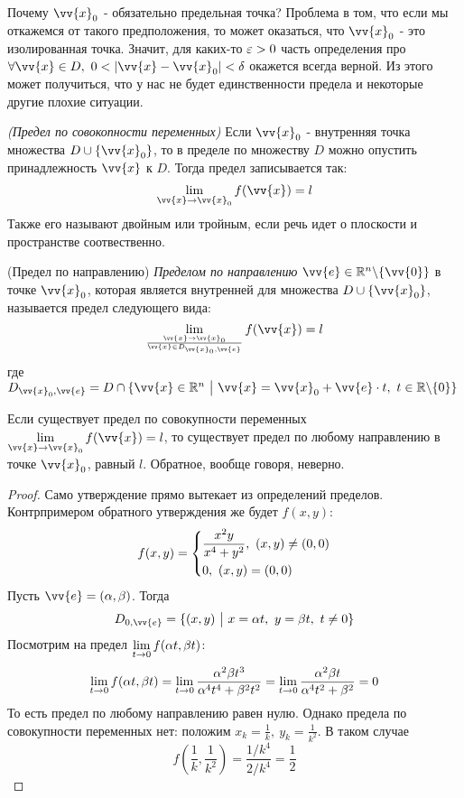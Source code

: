 \begin{note}
	Почему $\vv{x}_0$ - обязательно предельная точка? Проблема в том, что если мы откажемся от такого предположения, то может оказаться, что $\vv{x}_0$ - это изолированная точка. Значит, для каких-то $\varepsilon > 0$ часть определения про $\forall \vv{x} \in D,\ 0 < |\vv{x} - \vv{x}_0| < \delta$ окажется всегда верной. Из этого может получиться, что у нас не будет единственности предела и некоторые другие плохие ситуации.
\end{note}

\begin{definition}
	\textit{(Предел по совокопности переменных)}
	Если $\vv{x}_0$ - внутренняя точка множества $D \cup \{\vv{x}_0\}$, то в пределе по множеству $D$ можно опустить принадлежность $\vv{x}$ к $D$. Тогда предел записывается так:
	\[
		\liml_{\vv{x} \to \vv{x}_0} f(\vv{x}) = l
	\]
	Также его называют двойным или тройным, если речь идет о плоскости и пространстве соотвественно.
\end{definition}
\begin{definition} (Предел по направлению)
	\textit{Пределом по направлению} $\vv{e} \in \R^n \bs \{\vv{0}\}$ в точке $\vv{x}_0$, которая является внутренней для множества $D \cup \{\vv{x}_0\}$, называется предел следующего вида:
	\[
		\liml_{\vv{x} \to \vv{x}_0 \over \vv{x} \in D_{\vv{x}_0, \vv{e}}} f(\vv{x}) = l
	\]
	где	\(
	D_{\vv{x}_0, \vv{e}} = D \cap \{\vv{x} \in \R^n \such \vv{x} = \vv{x}_0 + \vv{e} \cdot t,\ t \in \R \bs \{0\}\}
	\)
\end{definition}

\begin{theorem}
	Если существует предел по совокупности переменных $\liml_{\vv{x} \to \vv{x}_0} f(\vv{x}) = l$, то существует предел по любому направлению в точке $\vv{x}_0$, равный $l$. Обратное, вообще говоря, неверно.
\end{theorem}

\begin{proof}
	Само утверждение прямо вытекает из определений  пределов. Контрпримером обратного утверждения же будет $f(x, y)$:
	\[
		f(x, y) = \left\{\begin{aligned}
			&{\frac{x^2 y}{x^4 + y^2},\ (x, y) \neq (0, 0)}
			\\
			&{0,\ (x, y) = (0, 0)}
		\end{aligned}\right.
	\]
	Пусть $\vv{e} = (\alpha, \beta)$. Тогда
	\[
		D_{0, \vv{e}} = \{(x, y) \such x = \alpha t,\ y = \beta t,\ t \neq 0\}
	\]
	Посмотрим на предел $\lim\limits_{t \to 0} f(\alpha t, \beta t)$:
	\[
		\lim\limits_{t \to 0} f(\alpha t, \beta t) = \lim\limits_{t \to 0} \frac{\alpha^2 \beta t^3}{\alpha^4 t^4 + \beta^2 t^2} = \lim\limits_{t \to 0} \frac{\alpha^2 \beta t}{\alpha^4 t^2 + \beta^2} = 0
	\]
	То есть предел по любому направлению равен нулю. Однако предела по совокупности переменных нет: положим $x_k = \frac{1}{k},\ y_k = \frac{1}{k^2}$. В таком случае
	\[
		f\left(\frac{1}{k}, \frac{1}{k^2}\right) = \frac{1 / k^4}{2 / k^4} = \frac{1}{2}
	\]
\end{proof}


